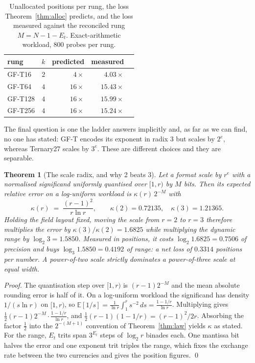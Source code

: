 \documentclass[11pt]{article}
\newtheorem{theorem}{Theorem}
\theoremstyle{definition}
\begin{document}
\begin{table}[t]\centering
\caption{Unallocated positions per rung, the loss Theorem~\ref{thm:alloc}
predicts, and the loss measured against the reconciled rung
$M = N - 1 - E_t$. Exact-arithmetic workload, 800 probes per rung.}
\label{tab:alloc}
\begin{tabular}{lrrrr}
\toprule
rung & $k$ & predicted & measured \\
\midrule
GF-T16  & $2$ & $4\times$  & $4.03\times$  \\
GF-T64  & $4$ & $16\times$ & $15.43\times$ \\
GF-T128 & $4$ & $16\times$ & $15.99\times$ \\
GF-T256 & $4$ & $16\times$ & $15.24\times$ \\
\bottomrule
\end{tabular}
\end{table}

The final question is one the ladder answers implicitly and, as far as we can
find, no one has stated: GF-T encodes its exponent in radix 3 but scales by
$2^{e}$, whereas Ternary27 scales by $3^{e}$. These are different choices and
they are separable.

\begin{theorem}[The scale radix, and why 2 beats 3]
\label{thm:scaleradix}
Let a format scale by $r^{e}$ with a normalised significand uniformly quantised
over $[1, r)$ by $M$ bits. Then its expected relative error on a log-uniform
workload is $\kappa(r)\,2^{-M}$ with
\[
\kappa(r) \;=\; \frac{(r-1)^{2}}{r\ln r},
\qquad \kappa(2) = 0.72135,\quad \kappa(3) = 1.21365 .
\]
Holding the field layout fixed, moving the scale from $r=2$ to $r=3$ therefore
multiplies the error by $\kappa(3)/\kappa(2) = 1.6825$ while multiplying the
dynamic range by $\log_2 3 = 1.5850$. Measured in positions, it costs
$\log_2 1.6825 = 0.7506$ of precision and buys $\log_3 1.5850 = 0.4192$ of range:
a net loss of $0.3314$ positions per number. A power-of-two scale strictly
dominates a power-of-three scale at equal width.
\end{theorem}

\begin{proof}
The quantisation step over $[1,r)$ is $(r-1)2^{-M}$ and the mean absolute
rounding error is half of it. On a log-uniform workload the significand has
density $1/(s\ln r)$ on $[1,r)$, so
$\mathbb{E}[1/s] = \frac{1}{\ln r}\int_1^{r} s^{-2}\,ds = \frac{1-1/r}{\ln r}$.
Multiplying gives $\tfrac12 (r-1)2^{-M}\cdot\frac{1-1/r}{\ln r}$, and
$\tfrac12(r-1)(1-1/r) = (r-1)^2/2r$. Absorbing the factor $\tfrac12$ into the
$2^{-(M+1)}$ convention of Theorem~\ref{thm:law} yields $\kappa$ as stated. For
the range, $E_t$ trits span $3^{E_t}$ steps of $\log_2 r$ binades each. One
mantissa bit halves the error and one exponent trit triples the range, which
fixes the exchange rate between the two currencies and gives the position
figures. \qed
\end{proof}
\end{document}
